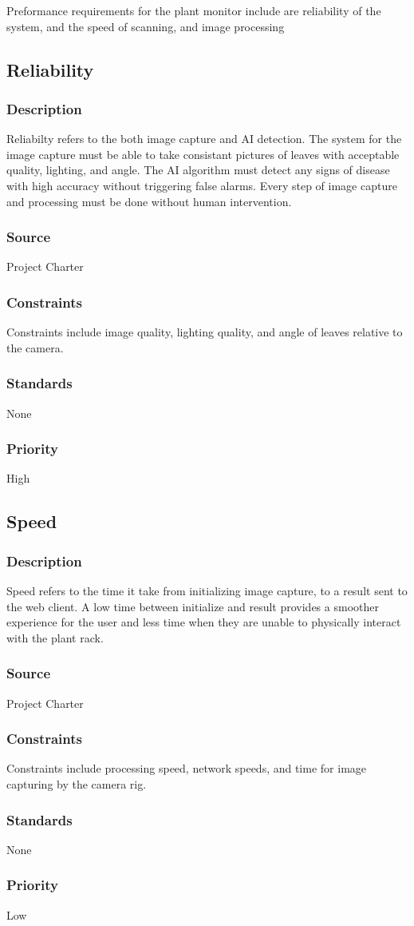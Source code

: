 
Preformance requirements for the plant monitor include are reliability of the system, and the speed of scanning, and image processing

\subsection{Reliability}
\subsubsection{Description}
Reliabilty refers to the both image capture and AI detection. The system for the image capture must be able to take consistant pictures of leaves with acceptable quality, lighting, and angle.
The AI algorithm must detect any signs of disease with high accuracy without triggering false alarms. Every step of image capture and processing must be done without human intervention.
\subsubsection{Source}
Project Charter
\subsubsection{Constraints}
Constraints include image quality, lighting quality, and angle of leaves relative to the camera.
\subsubsection{Standards}
None
\subsubsection{Priority}
High

\subsection{Speed}
\subsubsection{Description}
Speed refers to the time it take from initializing image capture, to a result sent to the web client. 
A low time between initialize and result provides a smoother experience for the user and less time when they are unable to physically interact with the plant rack.
\subsubsection{Source}
Project Charter
\subsubsection{Constraints}
Constraints include processing speed, network speeds, and time for image capturing by the camera rig.
\subsubsection{Standards}
None
\subsubsection{Priority}
Low